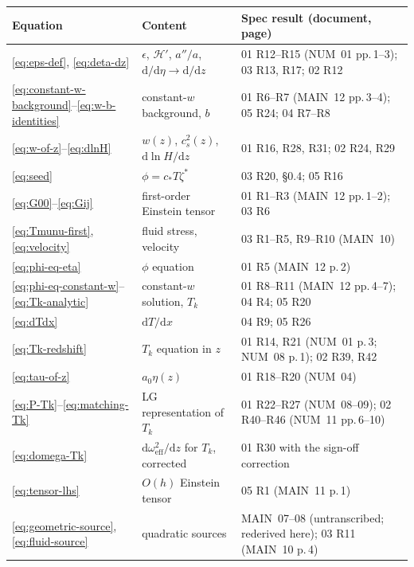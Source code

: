 \documentclass[11pt,a4paper]{article}
\newcommand{\cH}{\mathcal{H}}
\newcommand{\dd}{\mathrm{d}}
\newcommand{\cstar}{c_{*}}
\newcommand{\om}{\omega_{\mathrm{eff}}}
\newcommand{\eps}{\epsilon}
\newcommand{\spec}[1]{\textsf{#1}}
\newcommand{\note}[1]{\textsf{#1}}
\theoremstyle{remark}
\begin{document}
\begin{longtable}{p{2.2cm}p{5.8cm}p{6.8cm}}
\toprule
Equation & Content & Spec result (document, page) \\
\midrule
\eqref{eq:eps-def}, \eqref{eq:deta-dz} & $\eps$, $\cH'$, $a''/a$, $\dd/\dd\eta\to\dd/\dd z$ & \spec{01 R12--R15} (\note{NUM}~01 pp.\,1--3); \spec{03 R13, R17}; \spec{02 R12} \\
\eqref{eq:constant-w-background}--\eqref{eq:w-b-identities} & constant-$w$ background, $b$ & \spec{01 R6--R7} (\note{MAIN}~12 pp.\,3--4); \spec{05 R24}; \spec{04 R7--R8} \\
\eqref{eq:w-of-z}--\eqref{eq:dlnH} & $w(z)$, $c_s^2(z)$, $\dd\ln H/\dd z$ & \spec{01 R16, R28, R31}; \spec{02 R24, R29} \\
\eqref{eq:seed} & $\phi = \cstar T\zeta^*$ & \spec{03 R20, \S0.4}; \spec{05 R16} \\
\eqref{eq:G00}--\eqref{eq:Gij} & first-order Einstein tensor & \spec{01 R1--R3} (\note{MAIN}~12 pp.\,1--2); \spec{03 R6} \\
\eqref{eq:Tmunu-first}, \eqref{eq:velocity} & fluid stress, velocity & \spec{03 R1--R5, R9--R10} (\note{MAIN}~10) \\
\eqref{eq:phi-eq-eta} & $\phi$ equation & \spec{01 R5} (\note{MAIN}~12 p.\,2) \\
\eqref{eq:phi-eq-constant-w}--\eqref{eq:Tk-analytic} & constant-$w$ solution, $T_k$ & \spec{01 R8--R11} (\note{MAIN}~12 pp.\,4--7); \spec{04 R4}; \spec{05 R20} \\
\eqref{eq:dTdx} & $\dd T/\dd x$ & \spec{04 R9}; \spec{05 R26} \\
\eqref{eq:Tk-redshift} & $T_k$ equation in $z$ & \spec{01 R14, R21} (\note{NUM}~01 p.\,3; \note{NUM}~08 p.\,1); \spec{02 R39, R42} \\
\eqref{eq:tau-of-z} & $a_0\eta(z)$ & \spec{01 R18--R20} (\note{NUM}~04) \\
\eqref{eq:P-Tk}--\eqref{eq:matching-Tk} & LG representation of $T_k$ & \spec{01 R22--R27} (\note{NUM}~08--09); \spec{02 R40--R46} (\note{NUM}~11 pp.\,6--10) \\
\eqref{eq:domega-Tk} & $\dd\om^2/\dd z$ for $T_k$, corrected & \spec{01 R30} with the sign-off correction \\
\eqref{eq:tensor-lhs} & $O(h)$ Einstein tensor & \spec{05 R1} (\note{MAIN}~11 p.\,1) \\
\eqref{eq:geometric-source}, \eqref{eq:fluid-source} & quadratic sources & \note{MAIN}~07--08 (untranscribed; rederived here); \spec{03 R11} (\note{MAIN}~10 p.\,4) \\

\end{longtable}
\end{document}
